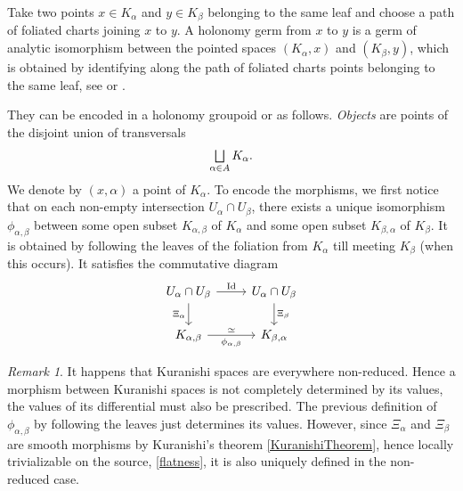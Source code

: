 \documentclass[JEP,XML,SOM,Unicode]{cedram}
\let\oldbigsqcup\bigsqcup
\renewcommand{\bigsqcup}{\mathop{\textstyle\oldbigsqcup}\displaylimits}
\DeclareMathOperator{\Id}{Id}
\theoremstyle{plain}
\theoremstyle{definition}
\theoremstyle{remark}
\newtheorem{remark}[theorem]{Remark}
\numberwithin{equation}{section}
\let\uniondisjointe\bigsqcup
\begin{document}
Take two points $x\in K_\alpha$ and $y\in K_\beta$ belonging to the same leaf and choose a path of foliated charts joining $x$ to $y$. A holonomy germ from $x$ to $y$ is a germ of analytic isomorphism between the pointed spaces $(K_\alpha,x)$ and $(K_\beta,y)$, which is obtained by identifying along the path of foliated charts points belonging to the same leaf, see \cite[\S 2.1]{Moerdijk} or \cite{CLN}.

They can be encoded in a holonomy groupoid \cite[\S 5.2]{Moerdijk} or \cite{Ha} as follows. \emph{Objects} are points of the disjoint union of transversals
\begin{equation}
\label{objectshg}
\uniondisjointe_{\alpha\in A} K_\alpha.
\end{equation}
We denote by $(x,\alpha)$ a point of $K_\alpha$. To encode the morphisms, we first notice that on each non-empty intersection $U_{\alpha}\cap U_{\beta}$, there exists a unique isomorphism $\phi_{\alpha,\beta}$ between some open subset $K_{\alpha, \beta}$ of $K_{\alpha}$ and some open subset $K_{\beta, \alpha}$ of $K_{\beta}$. It is obtained by following the leaves of the foliation from $K_{\alpha}$ till meeting $K_{\beta}$ (when this occurs). It satisfies the commutative diagram\vspace*{-3pt}
\begin{equation}
\label{CDhol}
\begin{tikzcd}
U_{\alpha}\cap U_{\beta} \arrow[d,"\Xi_{\alpha}"']\arrow[r,"\Id"] &U_{\alpha}\cap U_{\beta}\arrow[d,"\Xi_{\beta}"]\\
K_{\alpha,\beta}\arrow[r,"\simeq","\phi_{\alpha,\beta}"'] &K_{\beta,\alpha}
\end{tikzcd}
\end{equation}

\begin{remark}
\label{reducedrigidified}
It happens that Kuranishi spaces are everywhere non-reduced. Hence a morphism between Kuranishi spaces is not completely determined by its values, the values of its differential must also be prescribed. The previous definition of $\phi_{\alpha,\beta}$ by following the leaves just determines its values. However, since $\Xi_\alpha$ and $\Xi_\beta$ are smooth morphisms by Kuranishi's theorem \ref{KuranishiTheorem}, hence locally trivializable on the source, \cf \eqref{flatness}, it is also uniquely defined in the non-reduced case.
\end{remark}
\end{document}
